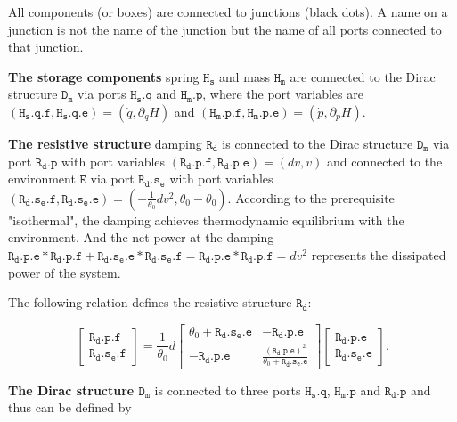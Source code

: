 \documentclass[
	parskip, 			   %
	twoside, 			   %
	DIV=14, 			   %
	BCOR=15.0mm, 		   %
	headsepline, 		   %
	open=right, 		   %
	captions=tableheading, %
	bibliography=totoc,    %
	numbers=noenddot       %
]{scrreprt}
\begin{document}
All components (or boxes) are connected to junctions (black dots). A name on a junction is not the name of the junction but the name of all ports connected to that junction.

\textbf{The storage components} spring $\mathtt{H_{s}}$ and mass $\mathtt{H_{m}}$ are connected to the Dirac structure $\mathtt{D_m}$ via ports $\mathtt{H_{s}.q}$ and $\mathtt{H_{m}.p}$, where the port variables are $(\mathtt{H_{s}.q.f}, \mathtt{H_{s}.q.e}) = (\dot{q}, \partial_q H)$ and $(\mathtt{H_{m}.p.f}, \mathtt{H_{m}.p.e}) = (\dot{p}, \partial_p H)$.

\textbf{The resistive structure} damping $\mathtt{R_{d}}$ is connected to the Dirac structure $\mathtt{D_m}$ via port $\mathtt{R_{d}.p}$ with port variables $(\mathtt{R_{d}.p.f}, \mathtt{R_{d}.p.e}) = (dv, v)$ and connected to the environment $\mathtt{E}$ via port $\mathtt{R_{d}.s_{e}}$ with port variables $(\mathtt{R_{d}.s_{e}.f}, \mathtt{R_{d}.s_{e}.e}) = (-\frac{1}{\theta_{0}}dv^2, \theta_{0}-\theta_{0})$. According to the prerequisite "isothermal", the damping achieves thermodynamic equilibrium with the environment. And the net power at the damping $\mathtt{R_{d}.p.e} * \mathtt{R_{d}.p.f} + \mathtt{R_{d}.s_{e}.e} * \mathtt{R_{d}.s_{e}.f} = \mathtt{R_{d}.p.e} * \mathtt{R_{d}.p.f} = dv^2$ represents the dissipated power of the system.

The following relation defines the resistive structure $\mathtt{R_d}$:

\begin{equation}
    \label{eq:resistive_structure_idho}
    \left[\begin{array}{l}\mathtt{R_{d}.p.f} \\ \mathtt{R_{d}.s_{e}.f}\end{array}\right]=\frac{1}{\theta_0} d\left[\begin{array}{rr}\theta_0+\mathtt{R_{d}.s_{e}.e} & -\mathtt{R_{d}.p.e} \\ -\mathtt{R_{d}.p.e} & \frac{(\mathtt{R_{d}.p.e})^2}{\theta_0+\mathtt{R_{d}.s_{e}.e}}\end{array}\right]\left[\begin{array}{l}\mathtt{R_{d}.p.e} \\ \mathtt{R_{d}.s_{e}.e}\end{array}\right].
\end{equation}

\textbf{The Dirac structure $\mathtt{D_m}$} is connected to three ports $\mathtt{H_{s}.q}$, $\mathtt{H_{m}.p}$ and $\mathtt{R_{d}.p}$ and thus can be defined by
\end{document}
